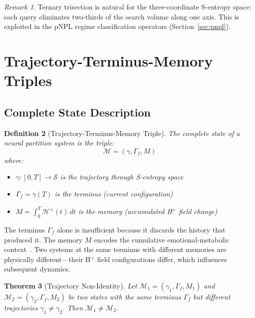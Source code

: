 \documentclass[10pt,twocolumn]{article}
\newtheorem{theorem}{Theorem}[section]
\newtheorem{definition}[theorem]{Definition}
\theoremstyle{remark}
\newtheorem{remark}[theorem]{Remark}
\newcommand{\Sspace}{\mathcal{S}}
\newcommand{\Gstate}{\Gamma}
\newcommand{\Hfield}{\mathcal{H}^+}
\newcommand{\Mstate}{\mathcal{M}}
\begin{document}
\begin{remark}
Ternary trisection is natural for the three-coordinate S-entropy space: each query eliminates two-thirds of the search volume along one axis. This is exploited in the pNPL regime classification operators (Section~\ref{sec:pnpl}).
\end{remark}

\section{Trajectory-Terminus-Memory Triples}
\label{sec:ttm}

\subsection{Complete State Description}

\begin{definition}[Trajectory-Terminus-Memory Triple]
\label{def:ttm}
The complete state of a neural partition system is the triple:
\begin{equation}
\Mstate = (\gamma, \Gstate_f, M)
\label{eq:ttm}
\end{equation}
where:
\begin{itemize}[noitemsep]
\item $\gamma: [0,T] \to \Sspace$ is the \emph{trajectory} through S-entropy space
\item $\Gstate_f = \gamma(T)$ is the \emph{terminus} (current configuration)
\item $M = \int_0^T \dot{\Hfield}(t)\,dt$ is the \emph{memory} (accumulated H$^+$ field change)
\end{itemize}
\end{definition}

The terminus $\Gstate_f$ alone is insufficient because it discards the history that produced it. The memory $M$ encodes the cumulative emotional-metabolic context~\cite{damasio1994descartes,mitchell1961coupling}. Two systems at the same terminus with different memories are physically different---their H$^+$ field configurations differ, which influences subsequent dynamics.

\begin{theorem}[Trajectory Non-Identity]
\label{thm:nonidentity}
Let $\Mstate_1 = (\gamma_1, \Gstate_f, M_1)$ and $\Mstate_2 = (\gamma_2, \Gstate_f, M_2)$ be two states with the same terminus $\Gstate_f$ but different trajectories $\gamma_1 \neq \gamma_2$. Then $\Mstate_1 \neq \Mstate_2$.
\end{theorem}
\end{document}
